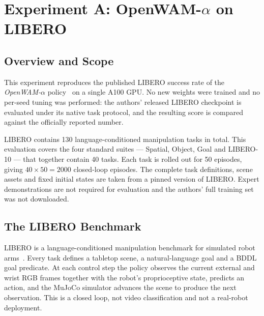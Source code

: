 
\section{Experiment A: \texorpdfstring{OpenWAM-$\alpha$}{OpenWAM-alpha} on LIBERO}
\label{sec:owa}

\subsection{Overview and Scope}
\label{sec:owa-overview}

This experiment reproduces the published LIBERO success rate of the
\emph{OpenWAM-$\alpha$} policy~\cite{openwam2026} on a single A100 GPU. No new
weights were trained and no per-seed tuning was performed: the authors'
released LIBERO checkpoint is evaluated under its native task protocol, and the
resulting score is compared against the officially reported number.

LIBERO contains 130 language-conditioned manipulation tasks in total. This
evaluation covers the four standard suites --- Spatial, Object, Goal and
LIBERO-10 --- that together contain 40 tasks. Each task is rolled out for 50
episodes, giving $40 \times 50 = 2000$ closed-loop episodes. The complete task
definitions, scene assets and fixed initial states are taken from a pinned
version of LIBERO. Expert demonstrations are not required for evaluation and
the authors' full training set was not downloaded.

\subsection{The LIBERO Benchmark}
\label{sec:owa-benchmark}

LIBERO is a language-conditioned manipulation benchmark for simulated robot
arms~\cite{libero2023}. Every task defines a tabletop scene, a natural-language
goal and a BDDL goal predicate. At each control step the policy observes the
current external and wrist RGB frames together with the robot's proprioceptive
state, predicts an action, and the MuJoCo simulator advances the scene to
produce the next observation. This is a closed loop, not video classification
and not a real-robot deployment.

